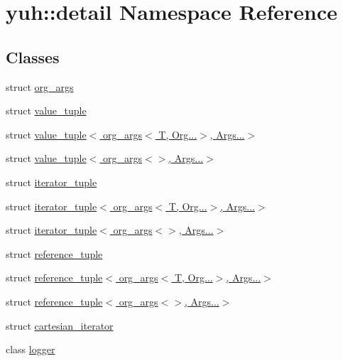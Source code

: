 \hypertarget{namespaceyuh_1_1detail}{\section{yuh\-:\-:detail \-Namespace \-Reference}
\label{d9/d72/namespaceyuh_1_1detail}
}
\subsection*{\-Classes}
\begin{DoxyCompactItemize}
\item 
struct \hyperlink{structyuh_1_1detail_1_1org__args}{org\-\_\-args}
\item 
struct \hyperlink{structyuh_1_1detail_1_1value__tuple}{value\-\_\-tuple}
\item 
struct \hyperlink{structyuh_1_1detail_1_1value__tuple_3_01org__args_3_01T_00_01Org_8_8_8_4_00_01Args_8_8_8_4}{value\-\_\-tuple$<$ org\-\_\-args$<$ T, Org...$>$, Args...$>$}
\item 
struct \hyperlink{structyuh_1_1detail_1_1value__tuple_3_01org__args_3_4_00_01Args_8_8_8_4}{value\-\_\-tuple$<$ org\-\_\-args$<$$>$, Args...$>$}
\item 
struct \hyperlink{structyuh_1_1detail_1_1iterator__tuple}{iterator\-\_\-tuple}
\item 
struct \hyperlink{structyuh_1_1detail_1_1iterator__tuple_3_01org__args_3_01T_00_01Org_8_8_8_4_00_01Args_8_8_8_4}{iterator\-\_\-tuple$<$ org\-\_\-args$<$ T, Org...$>$, Args...$>$}
\item 
struct \hyperlink{structyuh_1_1detail_1_1iterator__tuple_3_01org__args_3_4_00_01Args_8_8_8_4}{iterator\-\_\-tuple$<$ org\-\_\-args$<$$>$, Args...$>$}
\item 
struct \hyperlink{structyuh_1_1detail_1_1reference__tuple}{reference\-\_\-tuple}
\item 
struct \hyperlink{structyuh_1_1detail_1_1reference__tuple_3_01org__args_3_01T_00_01Org_8_8_8_4_00_01Args_8_8_8_4}{reference\-\_\-tuple$<$ org\-\_\-args$<$ T, Org...$>$, Args...$>$}
\item 
struct \hyperlink{structyuh_1_1detail_1_1reference__tuple_3_01org__args_3_4_00_01Args_8_8_8_4}{reference\-\_\-tuple$<$ org\-\_\-args$<$$>$, Args...$>$}
\item 
struct \hyperlink{structyuh_1_1detail_1_1cartesian__iterator}{cartesian\-\_\-iterator}
\item 
class \hyperlink{classyuh_1_1detail_1_1logger}{logger}
\end{DoxyCompactItemize}
